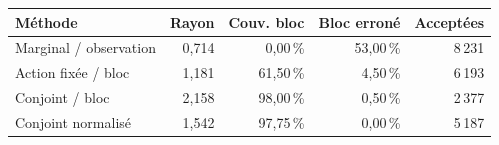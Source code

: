 \begin{tabularx}{\linewidth}{@{}Yrrrr@{}}
\toprule
Méthode & Rayon & Couv. bloc & Bloc erroné & Acceptées\\
\midrule
Marginal / observation & 0,714 & 0,00\,\% & 53,00\,\% & 8\,231\\
Action fixée / bloc & 1,181 & 61,50\,\% & 4,50\,\% & 6\,193\\
Conjoint / bloc & 2,158 & 98,00\,\% & 0,50\,\% & 2\,377\\
Conjoint normalisé & 1,542 & 97,75\,\% & 0,00\,\% & 5\,187\\
\bottomrule
\end{tabularx}